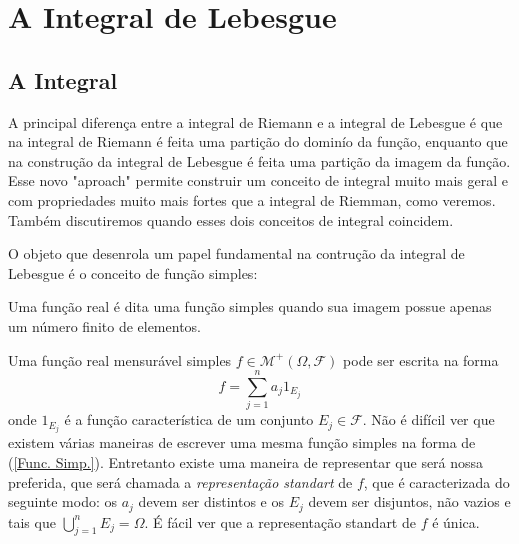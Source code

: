 \chapter[Aula 8]{A Integral de Lebesgue}
\chaptermark{}

\section{A Integral}

A principal diferença entre a integral de Riemann e a integral
de Lebesgue é que na integral de Riemann é feita uma 
partição do dominío da função, enquanto que na construção da
 integral de Lebesgue é feita uma partição da imagem da função.
Esse novo  "aproach" permite construir um conceito de integral muito
mais geral e com propriedades muito mais fortes  que a integral de Riemman, 
como veremos. Também discutiremos quando esses dois conceitos 
de integral coincidem.

O objeto que desenrola um papel fundamental na 
contrução da integral de Lebesgue é o conceito de função simples: 
\begin{definicao}
Uma função real é dita uma função simples
 quando sua imagem possue apenas um número
  finito de elementos.
\end{definicao}
Uma função real  mensurável simples $f\in \mathcal{M}^{+}(\Omega,\mathcal{F})$ pode ser escrita na forma 
\begin{equation}\label{Func. Simp.}
f=\sum_{j=1}^{n}a_j 1_{E_j}
\end{equation}
onde $1_{E_j}$ é a função característica de um conjunto $E_j\in \mathcal{F}$. 
 Não é difícil ver que existem várias maneiras de escrever uma mesma função
  simples na forma de (\ref{Func. Simp.}). Entretanto existe uma maneira de
  representar  que será nossa preferida, que será chamada a
   \emph{representação standart } de $f$, 
   que é caracterizada do seguinte modo: os $a_j$ 
   devem ser distintos e os $E_j$ devem ser disjuntos,  não vazios e tais que 
   $\bigcup_{j=1}^nE_j=\Omega$. É fácil ver que a representação standart de $f$ é única.